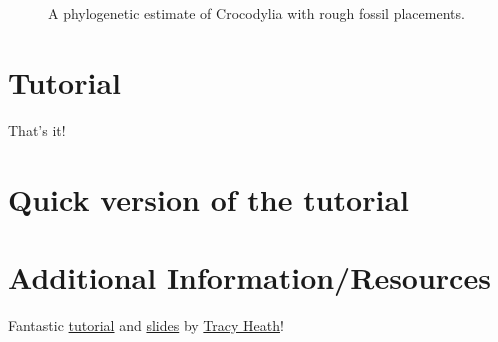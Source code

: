 \documentclass{article}
\begin{document}
    \begin{figure}[htbp]
        \centering
        \caption{A phylogenetic estimate of Crocodylia with rough fossil placements.}
        \label{fig:crocFossils}
    \end{figure}

\section{Tutorial}
\newcommand{\step}[2]{\addtocounter{stepCounter}{1} {\bf \hypertarget{step\arabic{stepCounter}}{Step \arabic{stepCounter}:}}\xspace #2\par}
\newcommand{\intermediate}[1]{#1}


That's it!

\newpage
\section{Quick version of the tutorial}
\setcounter{stepCounter}{0}
\renewcommand{\step}[2]{\addtocounter{stepCounter}{1} {\bf \hyperlink{step\arabic{stepCounter}}{Step \arabic{stepCounter}}:}\xspace #1\par}
\renewcommand{\intermediate}[1]{}


\newpage
\section{Additional Information/Resources}
Fantastic
\href{http://treethinkers.org/divergence-time-estimation-using-beast/}{tutorial}
and
\href{https://molevol.mbl.edu/wiki/images/6/6f/Bodega_2013_divtime_lecture.pdf}{slides}
by \href{http://phylo.bio.ku.edu/content/tracy-heath}{Tracy Heath}!

\newpage

\end{document}
